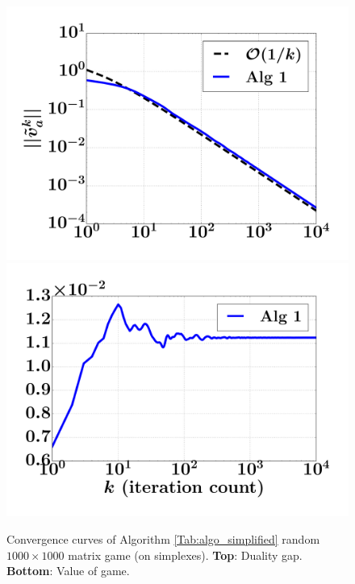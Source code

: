 \documentclass[12pt]{article}
\begin{document}
\begin{figure}
  \includegraphics[width=1\linewidth]{simplex_dgap.pdf}
  \includegraphics[width=1\linewidth]{simplex_NE.pdf}
  \caption{Convergence curves of Algorithm \ref{Tab:algo_simplified} random $1000 \times 1000$ matrix game (on simplexes).
  \textbf{Top}: Duality gap. \textbf{Bottom}: Value of game.}
  \label{Tab:sim_dgap_curve}
\end{figure}
\end{document}
